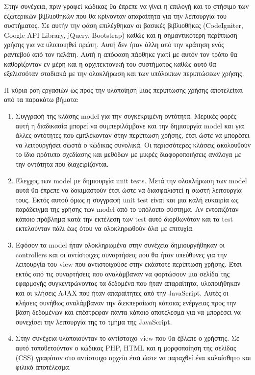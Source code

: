 Στην συνέχεια, πριν γραφεί κώδικας θα έπρεπε να γίνει η επιλογή και το στήσιμο των εξωτερικών βιβλιοθηκών που θα κρίνονταν απαραίτητα για την λειτουργία του συστήματος. Σε αυτήν την φάση επιλέχθηκαν οι βασικές βιβλιοθήκες (CodeIgniter, Google API Library, jQuery, Bootstrap) καθώς και η σημαντικότερη περίπτωση χρήσης για να υλοποιηθεί πρώτη. Αυτή δεν ήταν άλλη από την κράτηση ενός ραντεβού από τον πελάτη. Αυτή η απόφαση πάρθηκε γιατί με αυτόν τον τρόπο θα καθορίζονταν εν μέρη και η αρχιτεκτονική του συστήματος καθώς αυτό θα εξελισσόταν σταδιακά με την ολοκλήρωση και των υπόλοιπων περιπτώσεων χρήσης.

Η κύρια ροή εργασιών ως προς την υλοποίηση μιας περίπτωσης χρήσης αποτελείται από τα παρακάτω βήματα:
\begin{enumerate}
\item Συγγραφή της κλάσης model για την συγκεκριμένη οντότητα. Μερικές φορές αυτή η διαδικασία μπορεί να συμπεριλάμβανε και την δημιουργία model και για άλλες οντότητες που εμπλέκονταν στην περίπτωση χρήσης, έτσι ώστε να μπορέσει να λειτουργήσει σωστά ο κώδικας συνολικά. Οι περισσότερες κλάσεις ακολουθούν το ίδιο πρότυπο σχεδίασης και μεθόδων με μικρές διαφοροποιήσεις ανάλογα με την οντότητα που διαχειρίζονται. 
\item Έλεγχος των model με δημιουργία unit tests. Μετά την ολοκλήρωση των model αυτά θα έπρεπε να δοκιμαστούν έτσι ώστε να διασφαλιστεί η σωστή λειτουργία τους. Εκτός αυτού όμως η συγγραφή unit test είναι και μια καλή ευκαιρία ως παράδειγμα της χρήσης των model από το υπόλοιπο σύστημα. Αν εντοπιζόταν κάποιο πρόβλημα κατά την εκτέλεση των test αυτό διορθωνόταν και τα test εκτελούνταν πάλι έως ότου να ολοκληρωθούν όλα με επιτυχία.
\item Εφόσον τα model ήταν ολοκληρωμένα στην συνέχεια δημιουργήθηκαν οι controllers και οι αντίστοιχες συναρτήσεις που θα ήταν υπεύθυνες για την λειτουργία του view που αντιστοιχούσε στην εκάστοτε περίπτωση χρήσης. Έτσι εκτός από τις συναρτήσεις που αναλάμβαναν να φορτώσουν μια σελίδα της εφαρμογής συγκεντρώνοντας τα δεδομένα που ήταν απαραίτητα, υλοποιήθηκαν και οι κλήσεις AJAX που ήταν απαραίτητες από την JavaScript. Αυτές οι κλήσεις συνήθως αναλάμβαναν την διεκπεραίωση κάποιας ενέργειας προς την βάση δεδομένων και επέστρεφαν πάντα κάποιο αποτέλεσμα για να μπορέσει να συνεχίσει την λειτουργία της το τμήμα της JavaScript.
\item Στην συνέχεια υλοποιούνταν το αντίστοιχο view που θα έβλεπε ο χρήστης. Σε αυτό τοποθετούνταν ο κώδικας PHP, HTML και η μορφοποίηση της σελίδας (CSS) γραφόταν στο αντίστοιχο αρχείο έτσι ώστε να παραχθεί ένα καλαίσθητο και φιλικό αποτέλεσμα.

\end{enumerate}

